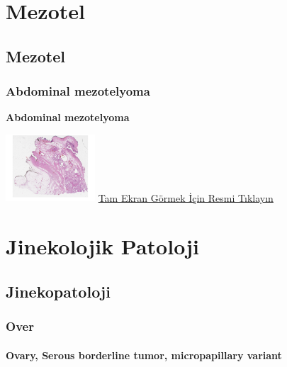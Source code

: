 \documentclass[
  letterpaper,
  DIV=11,
  numbers=noendperiod]{scrreprt}
\begin{document}
\part{Mezotel}

\hypertarget{sec-mezotel}{%
\chapter{Mezotel}\label{sec-mezotel}}

\hypertarget{sec-abdominal-mesothelioma}{%
\section{Abdominal mezotelyoma}\label{sec-abdominal-mesothelioma}}

\textbf{Abdominal mezotelyoma}

\href{https://images.patolojiatlasi.com/abdominal-mesothelioma/HE.html}{\includegraphics[width=0.25\textwidth,height=\textheight]{./screenshots/thumbnail_abdominal-mesothelioma.png}}
\href{https://images.patolojiatlasi.com/abdominal-mesothelioma/HE.html}{Tam
Ekran Görmek İçin Resmi Tıklayın}

\part{Jinekolojik Patoloji}

\hypertarget{sec-jinekopatoloji}{%
\chapter{Jinekopatoloji}\label{sec-jinekopatoloji}}

\hypertarget{sec-over}{%
\section{Over}\label{sec-over}}

\hypertarget{sec-ovary-serous-borderline-micropapillary}{%
\subsection{Ovary, Serous borderline tumor, micropapillary
variant}\label{sec-ovary-serous-borderline-micropapillary}}
\end{document}
